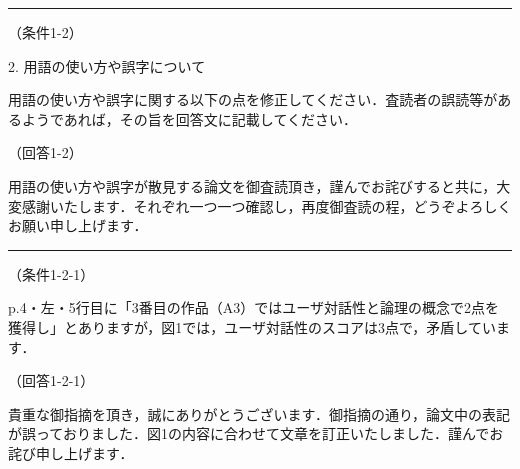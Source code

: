 \documentclass{jarticle} %
\def\subsection#1{ \vspace{1pc} {\gt #1} }
\def\nextans{ \vspace{2pc} \hrule }
\begin{document}
\newpage
\nextans
\subsection{（条件1-2）}

2. 用語の使い方や誤字について

用語の使い方や誤字に関する以下の点を修正してください．査読者の誤読等があるようであれば，その旨を回答文に記載してください．

\subsection{（回答1-2）}

用語の使い方や誤字が散見する論文を御査読頂き，謹んでお詫びすると共に，大変感謝いたします．それぞれ一つ一つ確認し，再度御査読の程，どうぞよろしくお願い申し上げます．




\newpage
\nextans
\subsection{（条件1-2-1）}

p.4・左・5行目に「3番目の作品（A3）ではユーザ対話性と論理の概念で2点を獲得し」とありますが，図1では，ユーザ対話性のスコアは3点で，矛盾しています．

\subsection{（回答1-2-1）}

貴重な御指摘を頂き，誠にありがとうございます．御指摘の通り，論文中の表記が誤っておりました．図1の内容に合わせて文章を訂正いたしました．謹んでお詫び申し上げます．
\end{document}
